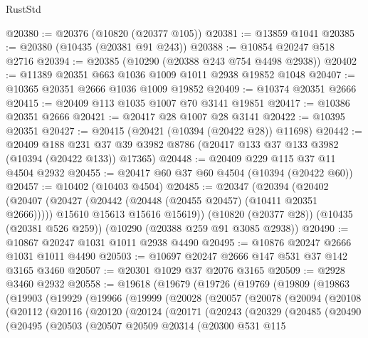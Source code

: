 \begin{lexlean}{RustStd}
\begin{coremodule}
@20380 := @20376 (@10820 (@20377 @105))
@20381 := @13859 @1041
@20385 := @20380 (@10435 (@20381 @91 @243))
@20388 := @10854 @20247 @518 @2716
@20394 := @20385 (@10290 (@20388 @243 @754 @4498 @2938))
@20402 := @11389 @20351 @663 @1036 @1009 @1011 @2938 @19852 @1048
@20407 := @10365 @20351 @2666 @1036 @1009 @19852
@20409 := @10374 @20351 @2666
@20415 := @20409 @113 @1035 @1007 @70 @3141 @19851
@20417 := @10386 @20351 @2666
@20421 := @20417 @28 @1007 @28 @3141
@20422 := @10395 @20351
@20427 := @20415 (@20421 (@10394 (@20422 @28)) @11698)
@20442 := @20409
    @188
    @231
    @37
    @39
    @3982
    @8786
    (@20417 @133 @37 @133 @3982 (@10394 (@20422 @133)) @17365)
@20448 := @20409 @229 @115 @37 @11 @4504 @2932
@20455 := @20417 @60 @37 @60 @4504 (@10394 (@20422 @60))
@20457 := @10402 (@10403 @4504)
@20485 := @20347
    (@20394
      (@20402
        (@20407 (@20427 (@20442 (@20448 (@20455 @20457) (@10411 @20351 @2666)))))
        @15610
        @15613
        @15616
        @15619))
    (@10820 (@20377 @28))
    (@10435 (@20381 @526 @259))
    (@10290 (@20388 @259 @91 @3085 @2938))
@20490 := @10867 @20247 @1031 @1011 @2938 @4490
@20495 := @10876 @20247 @2666 @1031 @1011 @4490
@20503 := @10697 @20247 @2666 @147 @531 @37 @142 @3165 @3460
@20507 := @20301 @1029 @37 @2076 @3165
@20509 := @2928 @3460 @2932
@20558 := @19618
    (@19679
      (@19726
        (@19769
          (@19809
            (@19863
              (@19903
                (@19929
                  (@19966
                    (@19999
                      (@20028
                        (@20057
                          (@20078
                            (@20094
                              (@20108
                                (@20112
                                  (@20116
                                    (@20120
                                      (@20124
                                        (@20171
                                          (@20243
                                            (@20329
                                              (@20485
                                                (@20490
                                                  (@20495
                                                    (@20503
                                                      (@20507
                                                        @20509
                                                        @20314
                                                        (@20300
                                                          @531
                                                          @115

\end{coremodule}
\end{lexlean}
